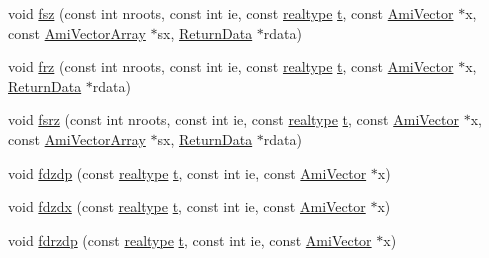 \begin{DoxyCompactItemize}
\item 
void \mbox{\hyperlink{classamici_1_1_model_ae977a1364eb91b11b7a1f6f63c0c4547}{fsz}} (const int nroots, const int ie, const \mbox{\hyperlink{namespaceamici_a1bdce28051d6a53868f7ccbf5f2c14a3}{realtype}} \mbox{\hyperlink{classamici_1_1_model_a711281d57e9710226face29151cc4641}{t}}, const \mbox{\hyperlink{classamici_1_1_ami_vector}{Ami\+Vector}} $\ast$x, const \mbox{\hyperlink{classamici_1_1_ami_vector_array}{Ami\+Vector\+Array}} $\ast$sx, \mbox{\hyperlink{classamici_1_1_return_data}{Return\+Data}} $\ast$rdata)
\item 
void \mbox{\hyperlink{classamici_1_1_model_a8a033ace9618ccc4c72d2956f0bf79ac}{frz}} (const int nroots, const int ie, const \mbox{\hyperlink{namespaceamici_a1bdce28051d6a53868f7ccbf5f2c14a3}{realtype}} \mbox{\hyperlink{classamici_1_1_model_a711281d57e9710226face29151cc4641}{t}}, const \mbox{\hyperlink{classamici_1_1_ami_vector}{Ami\+Vector}} $\ast$x, \mbox{\hyperlink{classamici_1_1_return_data}{Return\+Data}} $\ast$rdata)
\item 
void \mbox{\hyperlink{classamici_1_1_model_a5ddd801e9951f8057c2cfd8c66a27c42}{fsrz}} (const int nroots, const int ie, const \mbox{\hyperlink{namespaceamici_a1bdce28051d6a53868f7ccbf5f2c14a3}{realtype}} \mbox{\hyperlink{classamici_1_1_model_a711281d57e9710226face29151cc4641}{t}}, const \mbox{\hyperlink{classamici_1_1_ami_vector}{Ami\+Vector}} $\ast$x, const \mbox{\hyperlink{classamici_1_1_ami_vector_array}{Ami\+Vector\+Array}} $\ast$sx, \mbox{\hyperlink{classamici_1_1_return_data}{Return\+Data}} $\ast$rdata)
\item 
void \mbox{\hyperlink{classamici_1_1_model_a0be0b4d550d53eebd0e35c65f1b1bbc6}{fdzdp}} (const \mbox{\hyperlink{namespaceamici_a1bdce28051d6a53868f7ccbf5f2c14a3}{realtype}} \mbox{\hyperlink{classamici_1_1_model_a711281d57e9710226face29151cc4641}{t}}, const int ie, const \mbox{\hyperlink{classamici_1_1_ami_vector}{Ami\+Vector}} $\ast$x)
\item 
void \mbox{\hyperlink{classamici_1_1_model_add010f6b76558fb38611b5a79612a547}{fdzdx}} (const \mbox{\hyperlink{namespaceamici_a1bdce28051d6a53868f7ccbf5f2c14a3}{realtype}} \mbox{\hyperlink{classamici_1_1_model_a711281d57e9710226face29151cc4641}{t}}, const int ie, const \mbox{\hyperlink{classamici_1_1_ami_vector}{Ami\+Vector}} $\ast$x)
\item 
void \mbox{\hyperlink{classamici_1_1_model_ae7dc86ad0c432396fa21ad0f423c531c}{fdrzdp}} (const \mbox{\hyperlink{namespaceamici_a1bdce28051d6a53868f7ccbf5f2c14a3}{realtype}} \mbox{\hyperlink{classamici_1_1_model_a711281d57e9710226face29151cc4641}{t}}, const int ie, const \mbox{\hyperlink{classamici_1_1_ami_vector}{Ami\+Vector}} $\ast$x)

\end{DoxyCompactItemize}
